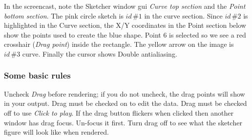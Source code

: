In the screencast, note the Sketcher window gui \textit{Curve top section} and the \textit{Point bottom section}. The pink circle sketch is $id\,\#1$ in the curve section. Since $id\,\#2$ is highlighted in the Curve section, the X/Y coordinates in the Point section below show the points used to create the blue shape. Point 6 is selected so we see a red crosshair (\textit{Drag point}) inside the rectangle. The yellow arrow on the image is $id\,\#3$ curve. Finally the cursor shows Double antialiasing.

\subsubsection*{Some basic rules}%
\label{ssub:some_basic_rules}

Uncheck \textit{Drag} before rendering; if you do not uncheck, the drag points will show in your output.
Drag must be checked on to edit the data. Drag must be checked off to use \textit{Click to play}.
If the drag button flickers when clicked then another window has drag focus. Un-focus it first.
Turn drag off to see what the sketcher figure will look like when rendered.

